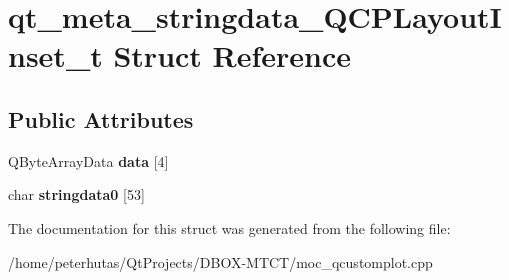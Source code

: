 \hypertarget{structqt__meta__stringdata___q_c_p_layout_inset__t}{}\section{qt\+\_\+meta\+\_\+stringdata\+\_\+\+Q\+C\+P\+Layout\+Inset\+\_\+t Struct Reference}
\label{structqt__meta__stringdata___q_c_p_layout_inset__t}
\subsection*{Public Attributes}
\begin{DoxyCompactItemize}
\item 
\mbox{\label{structqt__meta__stringdata___q_c_p_layout_inset__t_ae85a598291582d31cc12989c0279ea44}} 
Q\+Byte\+Array\+Data {\bfseries data} \mbox{[}4\mbox{]}
\item 
\mbox{\label{structqt__meta__stringdata___q_c_p_layout_inset__t_a7cc558fa6388df25517a33006f4a76a2}} 
char {\bfseries stringdata0} \mbox{[}53\mbox{]}
\end{DoxyCompactItemize}


The documentation for this struct was generated from the following file\+:\begin{DoxyCompactItemize}
\item 
/home/peterhutas/\+Qt\+Projects/\+D\+B\+O\+X-\/\+M\+T\+C\+T/moc\+\_\+qcustomplot.\+cpp\end{DoxyCompactItemize}
